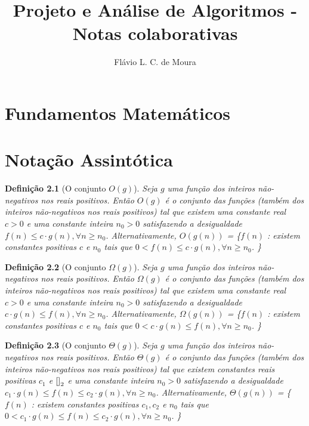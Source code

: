 \documentclass[12pt]{book}
\title{Projeto e Análise de Algoritmos - Notas colaborativas}
\author{Flávio L. C. de Moura}
\newtheorem{definicao}{Definição}
\begin{document}
\maketitle

\chapter{Fundamentos Matemáticos}

\chapter{Notação Assintótica}

\begin{definicao}[O conjunto $O(g)$] Seja $g$ uma função dos inteiros não-negativos nos reais positivos. Então $O(g)$ é o conjunto das funções (também dos inteiros não-negativos nos reais positivos) tal que existem uma constante real $c>0$ e uma constante inteira $n_0>0$ satisfazendo a desigualdade $f(n) \leq c\cdot g(n), \forall n \geq n_0$. Alternativamente, $O(g(n))$ = \{$f(n)$ : existem constantes positivas $c$ e $n_0$ tais que $0 < f(n) \leq c\cdot g(n), \forall n \geq n_0$. \}
\end{definicao}

\begin{definicao}[O conjunto $\Omega(g)$] Seja $g$ uma função dos inteiros não-negativos nos reais positivos. Então $\Omega(g)$ é o conjunto das funções (também dos inteiros não-negativos nos reais positivos) tal que existem uma constante real $c>0$ e uma constante inteira $n_0>0$ satisfazendo a desigualdade $c\cdot g(n) \leq f(n), \forall n \geq n_0$. Alternativamente, $\Omega(g(n))$ = \{$f(n)$ : existem constantes positivas $c$ e $n_0$ tais que $0 < c\cdot g(n)  \leq  f(n), \forall n \geq n_0$. \}
\end{definicao}

\begin{definicao}[O conjunto $\Theta(g)$] Seja $g$ uma função dos inteiros não-negativos nos reais positivos. Então $\Theta(g)$ é o conjunto das funções (também dos inteiros não-negativos nos reais positivos) tal que existem constantes reais positivas $c_1$ e $\cite{} _2$ e uma constante inteira $n_0>0$ satisfazendo a desigualdade $c_1\cdot g(n) \leq f(n) \leq c_2 \cdot g(n), \forall n \geq n_0$. Alternativamente, $\Theta(g(n))$ = \{$f(n)$ : existem constantes positivas $c_1, c_2$ e $n_0$ tais que $0 < c_1\cdot g(n)  \leq  f(n) \leq c_2 \cdot g(n), \forall n \geq n_0$. \}
\end{definicao}
\end{document}
